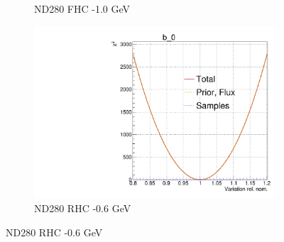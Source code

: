 \begin{figure}[h]
\begin{subfigure}[t]{0.32\textwidth}
	\caption{ND280 FHC -1.0 GeV}
\end{subfigure}
\begin{subfigure}[t]{0.32\textwidth}
	\includegraphics[width=\textwidth, trim={0mm 0mm 0mm 11mm}, clip,page=30]{figures/mach3/Asimov/Full_LLHscan_18July_BeRPA_U_ND280logL_scan}
	\caption{ND280 RHC -0.6 GeV}
\end{subfigure}


\end{figure}
